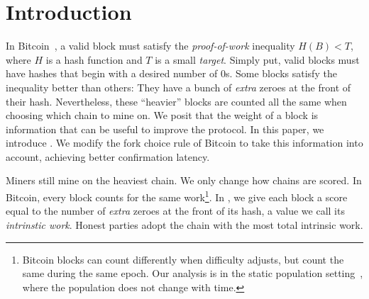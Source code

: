 \section{Introduction}

In Bitcoin~\cite{bitcoin}, a valid block must satisfy the
\emph{proof-of-work} inequality $H(B) < T$, where
$H$ is a hash function and $T$ is a small \emph{target}.
Simply put, valid blocks must have hashes that begin with a desired number of $0$s.
Some blocks satisfy the inequality better than others:
They have a bunch of \emph{extra} zeroes at the front of their hash.
Nevertheless, these ``heavier'' blocks are counted all the same when choosing
which chain to mine on.
We posit that the weight of a block is information
that can be useful to improve the protocol.
In this paper, we introduce \emph{\poem}.
We modify the fork choice rule of Bitcoin to take this information into account,
achieving better confirmation latency.

\noindent
{}
Miners still mine on the heaviest chain. We only change how chains are scored.
In Bitcoin, every block counts for the same work\footnote{Bitcoin blocks can count differently when
difficulty adjusts, but count the same during the same epoch. Our analysis is in the
static population setting~\cite{backbone}, where the population does not change with time.}.
In \poem, we give each block a score equal to the number of \emph{extra} zeroes at the front of its hash,
a value we call its \emph{intrinstic work}. Honest parties adopt the chain with the most total
intrinsic work.

